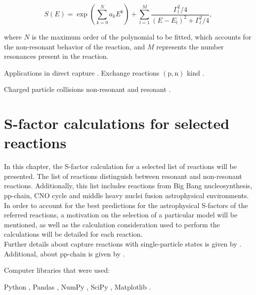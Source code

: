 \documentclass[openany]{book}
\begin{document}
\begin{equation}  \label{eq:empirical_hybridExponential}
	S(E) =  \exp { \left( \sum _{k = 0}^{N} {a_kE^k} \right) } + \sum_{l = 1}^{M} {\frac{\Gamma_l^2/4}{(E - E_l)^2 + \Gamma_l^2/4}},
\end{equation}

where $N$ is the maximum order of the polynomial to be fitted, which accounts for the non-resonant behavior of the reaction, and $M$ represents the number resonances present in the reaction. 

Applications in direct capture \cite{jennings_karataglidis_shoppa_1998}.  Exchange reactions $\mathrm{(p, n)}$ kind \cite{hussein_abdullah_2020}.

Charged particle collisions non-resonant \cite{ueda_sargeant_pato_hussein_2002} and resonant \cite{ueda_sargeant_pato_hussein_2004}. \\


\chapter{S-factor calculations for selected reactions} \label{ch:sfactorCalculations}

In this chapter, the S-factor calculation for a selected list of reactions will be presented. The list of reactions distinguish between resonant and non-resonant reactions. Additionally, this list includes reactions from Big Bang nucleosynthesis, pp-chain, CNO cycle and middle heavy nuclei fusion astrophysical environments.  \\




In order to account for the best predictions for the astrophysical S-factors of the referred reactions, a motivation on the selection of a particular model will be mentioned, as well as the calculation consideration used to perform the calculations will be detailed for each reaction. \\


Further details about capture reactions with single-particle states is given by \cite{huang_bertulani_guimaraes_2010}. \\

Additional, about pp-chain is given by \cite{adelberger_garcia_robertson_snover_balantekin_heeger_ramsey-musolf_bemmerer_junghans_bertulani_et_2011}.

Computer libraries that were used:

Python \cite{rossum_drake_2009}, Pandas \cite{mckinney_2010}, NumPy \cite{harris_millman_vanderwalt_gommers_virtanen_cournapeau_wieser_taylor_berg_smith_et_2020}, SciPy \cite{virtanen_gommers_oliphant_haberland_reddy_cournapeau_burovski_peterson_weckesser_bright_et_2020}, Matplotlib \cite{hunter_2007}.
\end{document}
